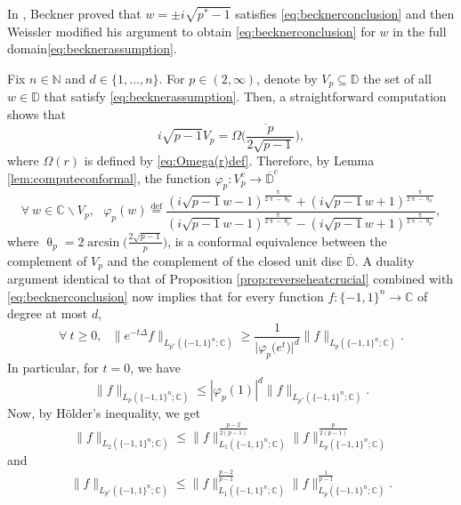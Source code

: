 \documentclass[11pt,reqno]{amsart}
\renewcommand{\leq}{\leqslant}
\renewcommand{\geq}{\geqslant}
\renewcommand{\setminus}{\smallsetminus}
\renewcommand{\pi}{\uppi}
\newcommand{\1}{\mathbf 1}
\theoremstyle{remark}
\newcommand{\C}{\mathbb C}
\newcommand{\N}{\mathbb N}
\newcommand{\eqdef}{\stackrel{\mathrm{def}}{=}}
\renewcommand{\theta}{\uptheta}
\renewcommand{\pi}{\uppi}
\renewcommand{\pi}{\uppi}
\newcommand{\mb}{\mathbb}
\begin{document}
In \cite{Bec75}, Beckner proved that $w=\pm i\sqrt{p^\ast-1}$ satisfies \eqref{eq:becknerconclusion} and then Weissler \cite{Wei79} modified his argument to obtain \eqref{eq:becknerconclusion} for $w$ in the full domain\eqref{eq:becknerassumption}.

\medskip

Fix $n\in\N$ and $d\in\{1,\ldots,n\}$. For $p\in(2,\infty)$, denote by $V_p\subseteq\mb{D}$ the set of all $w\in\mb{D}$ that satisfy \eqref{eq:becknerassumption}. Then, a straightforward computation shows that
\begin{equation}
i\sqrt{p-1} V_p = \overline{\Omega\Big(\frac{p}{2\sqrt{p-1}}\Big)},
\end{equation}
where $\Omega(r)$ is defined by \eqref{eq:Omega(r)def}. Therefore, by Lemma \ref{lem:computeconformal}, the function $\varphi_p: V_p^c\to\overline{\mb{D}}^c$
\begin{equation}
\forall \ w\in \mb{C}\setminus V_p, \ \ \ \varphi_p(w)\eqdef \frac{(i\sqrt{p-1}w-1)^{\frac{\pi}{2\pi-\theta_p}}+(i\sqrt{p-1}w+1)^{\frac{\pi}{2\pi-\theta_p}}}{(i\sqrt{p-1}w-1)^{\frac{\pi}{2\pi-\theta_p}}-(i\sqrt{p-1}w+1)^{\frac{\pi}{2\pi-\theta_p}}},
\end{equation}
where $\theta_p = 2\arcsin\big(\frac{2\sqrt{p-1}}{p}\big)$, is a conformal equivalence between the complement of $V_p$ and the complement of the closed unit disc $\overline{\mb{D}}$. A duality argument identical to that of Proposition \ref{prop:reverseheatcrucial} combined with \eqref{eq:becknerconclusion} now implies that for every function $f:\{-1,1\}^n\to \C$ of degree at most $d$,
\begin{equation}
\forall \ t\geq0, \ \ \ \|e^{-t\Delta}f\|_{L_{p^\ast}(\{-1,1\}^n;\C)} \geq \frac{1}{\big|\varphi_p\big(e^t\big)\big|^d} \|f\|_{L_p(\{-1,1\}^n;\C)}.
\end{equation}
In particular, for $t=0$, we have
\begin{equation} \label{eq:pp*}
\|f\|_{L_p(\{-1,1\}^n;\C)} \leq |\varphi_p(1)|^d \|f\|_{L_{p^\ast}(\{-1,1\}^n;\C)}.
\end{equation}
Now, by H\"older's inequality, we get
\begin{equation}
\|f\|_{L_2(\{-1,1\}^n;\C)}\leq \|f\|_{L_1(\{-1,1\}^n;\C)}^{\frac{p-2}{2(p-1)}} \|f\|_{L_p(\{-1,1\}^n;\C)}^{\frac{p}{2(p-1)}}
\end{equation}
and
\begin{equation}
\|f\|_{L_{p^\ast}(\{-1,1\}^n;\C)} \leq \|f\|_{L_1(\{-1,1\}^n;\C)}^{\frac{p-2}{p-1}} \|f\|_{L_p(\{-1,1\}^n;\C)}^{\frac{1}{p-1}}.
\end{equation}
\end{document}
